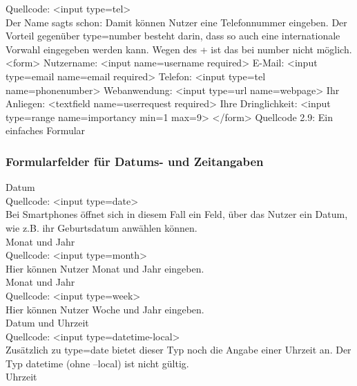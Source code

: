 Quellcode: <input type=tel>\\

Der Name sagts schon: Damit können Nutzer eine Telefonnummer eingeben. Der Vorteil gegenüber type=number besteht darin, dass so auch eine internationale Vorwahl eingegeben werden kann. Wegen des + ist das bei number nicht möglich.\\

<form>
Nutzername: <input name=username required>
E-Mail: <input type=email name=email required>
Telefon: <input type=tel name=phonenumber>
Webanwendung: <input type=url name=webpage>
Ihr Anliegen: <textfield name=userrequest required>
Ihre Dringlichkeit: <input type=range name=importancy min=1 max=9>
</form>
Quellcode 2.9: Ein einfaches Formular

\subsubsection{Formularfelder für Datums- und Zeitangaben}

Datum\\

Quellcode: <input type=date>\\

Bei Smartphones öffnet sich in diesem Fall ein Feld, über das Nutzer ein Datum, wie z.B. ihr Geburtsdatum anwählen können.\\

Monat und Jahr\\

Quellcode: <input type=month>\\

Hier können Nutzer Monat und Jahr eingeben.\\

Monat und Jahr\\

Quellcode: <input type=week>\\

Hier können Nutzer Woche und Jahr eingeben.\\

Datum und Uhrzeit\\

Quellcode: <input type=datetime-local>\\

Zusätzlich zu type=date bietet dieser Typ noch die Angabe einer Uhrzeit an. Der Typ datetime (ohne –local) ist nicht gültig.\\

Uhrzeit\\

